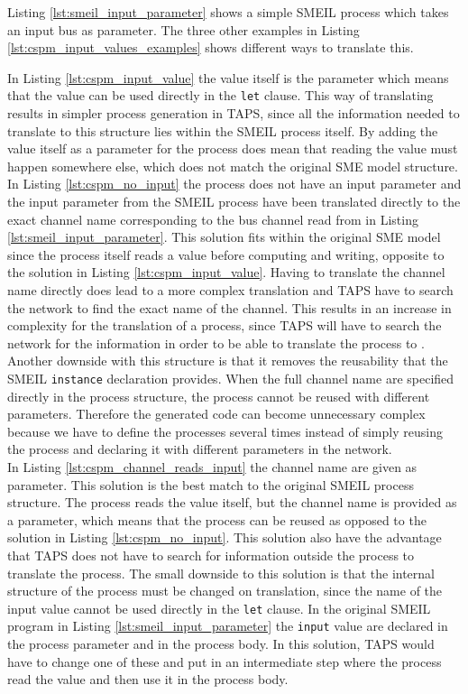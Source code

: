 Listing \ref{lst:smeil_input_parameter} shows a simple SMEIL process which takes an input bus as parameter. The three other examples in Listing \ref{lst:cspm_input_values_examples} shows different ways to translate this.

In Listing \ref{lst:cspm_input_value} the value itself is the parameter which means that the value can be used directly in the \texttt{let} clause.
This way of translating results in simpler process generation in TAPS, since all the information needed to translate to this structure lies within the SMEIL process itself. By adding the value itself as a parameter for the process does mean that reading the value must happen somewhere else, which does not match the original SME model structure. \\

In Listing \ref{lst:cspm_no_input} the process does not have an input parameter and the input parameter from the SMEIL process have been translated directly to the exact channel name corresponding to the bus channel read from in Listing \ref{lst:smeil_input_parameter}. This solution fits within the original SME model since the process itself reads a value before computing and writing, opposite to the solution in Listing \ref{lst:cspm_input_value}. Having to translate the channel name directly does lead to a more complex translation and TAPS have to search the network to find the exact name of the channel. This results in an increase in complexity for the translation of a process, since TAPS will have to search the network for the information in order to be able to translate the process to \cspm{}. Another downside with this structure is that it removes the reusability that the SMEIL \texttt{instance} declaration provides. When the full channel name are specified directly in the process structure, the process cannot be reused with different parameters. Therefore the generated code can become unnecessary complex because we have to define the processes several times instead of simply reusing the process and declaring it with different parameters in the network.\\

In Listing \ref{lst:cspm_channel_reads_input} the channel name are given as parameter. This solution is the best match to the original SMEIL process structure. The process reads the value itself, but the channel name is provided as a parameter, which means that the process can be reused as opposed to the solution in Listing \ref{lst:cspm_no_input}. This solution also have the advantage that TAPS does not have to search for information outside the process to translate the process.
The small downside to this solution is that the internal structure of the process must be changed on translation, since the name of the input value cannot be used directly in the \texttt{let} clause. In the original SMEIL program in Listing \ref{lst:smeil_input_parameter} the \texttt{input} value are declared in the process parameter and in the process body. In this solution, TAPS would have to change one of these and put in an intermediate step where the process read the value and then use it in the process body.\\

